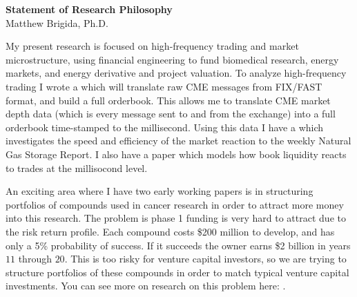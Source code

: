 \documentclass[12pt]{article}
\begin{document}
\vspace*{-3cm}
\begin{center}
{\bf Statement of Research Philosophy}\\
Matthew Brigida, Ph.D.
\end{center}
\vspace*{0.25cm}
My present research is focused on high-frequency trading and market microstructure, using financial engineering to fund biomedical research, energy markets, and energy derivative and project valuation.  To analyze high-frequency trading I wrote a \href{https://github.com/Matt-Brigida/CME-FIX-FAST-Translator}{\color{Blue}{series of scripts}} which will translate raw CME messages from FIX/FAST format, and build a full orderbook.  This allows me to translate CME market depth data (which is every message sent to and from the exchange) into a full orderbook time-stamped to the millisecond.  Using this data I have a \href{https://papers.ssrn.com/sol3/papers.cfm?abstract_id=2848527}{\color{Blue}{research paper}} which investigates the speed and efficiency of the market reaction to the weekly Natural Gas Storage Report.  I also have a paper which models how book liquidity reacts to trades at the millisocond level.

An exciting area where I have two early working papers is in structuring portfolios of compounds used in cancer research in order to attract more money into this research. The problem is phase 1 funding is very hard to attract due to the risk return profile.  Each compound costs \$200 million to develop, and has only a 5\% probability of success.  If it succeeds the owner earns \$2 billion in years $11$ through $20$.  This is too risky for venture capital investors, so we are trying to structure portfolios of these compounds in order to match typical venture capital investments.  You can see more on research on this problem here: \href{http://cancerx.mit.edu/}{\color{Blue}{http://cancerx.mit.edu/}}.
\end{document}
